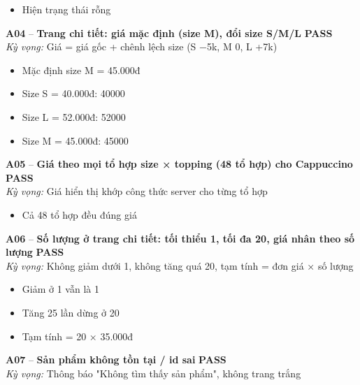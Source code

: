 \documentclass[a4paper,11pt]{article}
\newcommand{\ok}{\textcolor{okgreen}{\textbf{PASS}}}
\begin{document}
\begin{itemize}\footnotesize
\item \tick Hiện trạng thái rỗng
\end{itemize}
\begin{minipage}{\textwidth}\vspace{4pt}\textbf{\textcolor{brew}{A04}} -- \textbf{Trang chi tiết: giá mặc định (size M), đổi size S/M/L} \hfill \ok\\
{\small\emph{Kỳ vọng:} Giá = giá gốc + chênh lệch size (S −5k, M 0, L +7k)}
\end{minipage}
\begin{itemize}\footnotesize
\item \tick Mặc định size M = 45.000đ
\item \tick Size S = 40.000đ: 40000
\item \tick Size L = 52.000đ: 52000
\item \tick Size M = 45.000đ: 45000
\end{itemize}
\begin{minipage}{\textwidth}\vspace{4pt}\textbf{\textcolor{brew}{A05}} -- \textbf{Giá theo mọi tổ hợp size × topping (48 tổ hợp) cho Cappuccino} \hfill \ok\\
{\small\emph{Kỳ vọng:} Giá hiển thị khớp công thức server cho từng tổ hợp}
\end{minipage}
\begin{itemize}\footnotesize
\item \tick Cả 48 tổ hợp đều đúng giá
\end{itemize}
\begin{minipage}{\textwidth}\vspace{4pt}\textbf{\textcolor{brew}{A06}} -- \textbf{Số lượng ở trang chi tiết: tối thiểu 1, tối đa 20, giá nhân theo số lượng} \hfill \ok\\
{\small\emph{Kỳ vọng:} Không giảm dưới 1, không tăng quá 20, tạm tính = đơn giá × số lượng}
\end{minipage}
\begin{itemize}\footnotesize
\item \tick Giảm ở 1 vẫn là 1
\item \tick Tăng 25 lần dừng ở 20
\item \tick Tạm tính = 20 × 35.000đ
\end{itemize}
\begin{minipage}{\textwidth}\vspace{4pt}\textbf{\textcolor{brew}{A07}} -- \textbf{Sản phẩm không tồn tại / id sai} \hfill \ok\\
{\small\emph{Kỳ vọng:} Thông báo "Không tìm thấy sản phẩm", không trang trắng}
\end{minipage}
\end{document}
